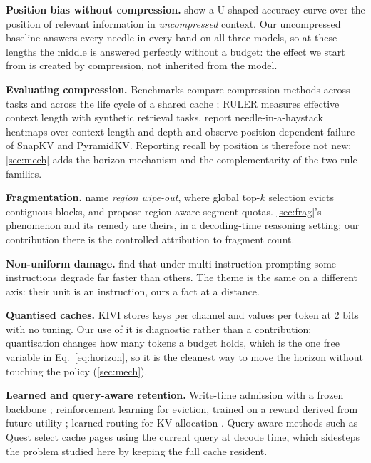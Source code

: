 \documentclass[10pt]{article}
\begin{document}
\textbf{Position bias without compression.} \citet{liu2024lost} show a U-shaped
accuracy curve over the position of relevant information in \emph{uncompressed}
context. Our uncompressed baseline answers every needle in every band on all
three models, so at these lengths the middle is answered perfectly without a
budget: the effect we start from is created by compression, not inherited from
the model.

\textbf{Evaluating compression.} Benchmarks compare compression methods across
tasks \citep{yuan2024kvbench} and across the life cycle of a shared cache
\citep{li2025scbench}; RULER \citep{hsieh2024ruler} measures effective context
length with synthetic retrieval tasks. \citet{indexmem2026} report
needle-in-a-haystack heatmaps over context length and depth and observe
position-dependent failure of SnapKV and PyramidKV. Reporting recall by
position is therefore not new; \cref{sec:mech} adds the horizon mechanism and
the complementarity of the two rule families.

\textbf{Fragmentation.} \citet{yang2026ams} name \emph{region wipe-out}, where
global top-$k$ selection evicts contiguous blocks, and propose region-aware
segment quotas. \cref{sec:frag}'s phenomenon and its remedy are theirs, in a
decoding-time reasoning setting; our contribution there is the controlled
attribution to fragment count.

\textbf{Non-uniform damage.} \citet{chen2025pitfalls} find that under
multi-instruction prompting some instructions degrade far faster than others.
The theme is the same on a different axis: their unit is an instruction, ours a
fact at a distance.

\textbf{Quantised caches.} KIVI \citep{liu2024kivi} stores keys per channel and
values per token at 2 bits with no tuning. Our use of it is diagnostic rather
than a contribution: quantisation changes how many tokens a budget holds, which
is the one free variable in Eq.~\eqref{eq:horizon}, so it is the cleanest way to
move the horizon without touching the policy (\cref{sec:mech}).

\textbf{Learned and query-aware retention.} Write-time admission with a frozen
backbone \citep{kvadmission2025}; reinforcement learning for eviction, trained
on a reward derived from future utility \citep{learningtoevict2026}; learned
routing for KV allocation \citep{triroute2026}. Query-aware methods such as
Quest \citep{tang2024quest} select cache pages using the current query at
decode time, which sidesteps the problem studied here by keeping the full
cache resident.
\end{document}
